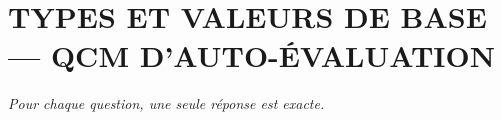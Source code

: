 
\section*{\textcolor{chapcolor}{\MakeUppercase{Types et valeurs de base — QCM d'auto-évaluation}}}

\begin{center}
\textit{Pour chaque question, une seule réponse est exacte.}
\end{center}


